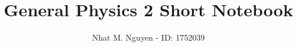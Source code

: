 \documentclass[9pt, landscape, a4paper]{scrartcl}
\title{\vspace{-4ex}\Large{General Physics 2 Short Notebook}}
\author{Nhat M. Nguyen - ID: 1752039}
\newcommand{\img}[2][]
  {
    \begin{figure}[H]
      \centering
      \texttt{[image: \#2]}
    \end{figure}
  }
\begin{document}
  \maketitle
  \setcounter{tocdepth}{2}

  \begin{multicols}{2}
    \tableofcontents
  \end{multicols}

  \clearpage

  {
    
  }
\end{document}
